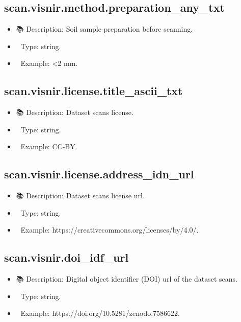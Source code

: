 \documentclass[
  letterpaper,
  DIV=11,
  numbers=noendperiod]{scrreprt}
\providecommand{\tightlist}{%
  \setlength{\itemsep}{0pt}\setlength{\parskip}{0pt}}\usepackage{longtable,booktabs,array}
\begin{document}
\subsection{scan.visnir.method.preparation\_any\_txt}\label{scan.visnir.method.preparation_any_txt-1}

\begin{itemize}
\tightlist
\item
  📚 Description: Soil sample preparation before scanning.
\item
  🔢 Type: string.
\item
  📖 Example: \textless2 mm.
\end{itemize}

\subsection{scan.visnir.license.title\_ascii\_txt}\label{scan.visnir.license.title_ascii_txt-1}

\begin{itemize}
\tightlist
\item
  📚 Description: Dataset scans license.
\item
  🔢 Type: string.
\item
  📖 Example: CC-BY.
\end{itemize}

\subsection{scan.visnir.license.address\_idn\_url}\label{scan.visnir.license.address_idn_url-1}

\begin{itemize}
\tightlist
\item
  📚 Description: Dataset scans license url.
\item
  🔢 Type: string.
\item
  📖 Example: https://creativecommons.org/licenses/by/4.0/.
\end{itemize}

\subsection{scan.visnir.doi\_idf\_url}\label{scan.visnir.doi_idf_url-1}

\begin{itemize}
\tightlist
\item
  📚 Description: Digital object identifier (DOI) url of the dataset
  scans.
\item
  🔢 Type: string.
\item
  📖 Example: https://doi.org/10.5281/zenodo.7586622.
\end{itemize}
\end{document}
